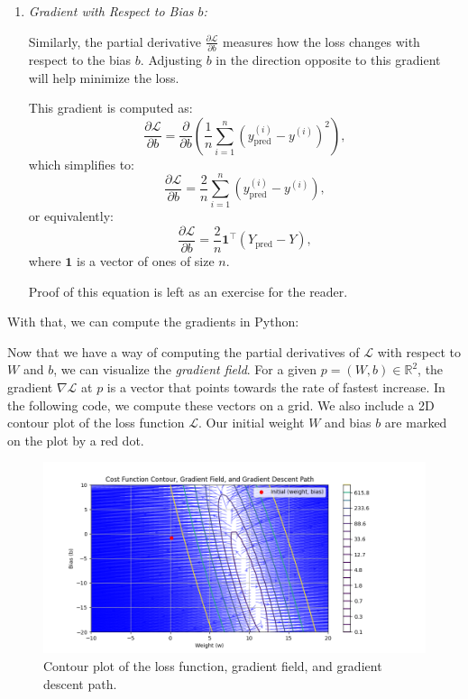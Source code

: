 \begin{enumerate}
    \item \textit{Gradient with Respect to Bias \( b \):}

    Similarly, the partial derivative \( \frac{\partial \mathcal{L}}{\partial b} \) measures how the loss changes with respect to the bias \( b \). Adjusting \( b \) in the direction opposite to this gradient will help minimize the loss.

    This gradient is computed as:
    \[
        \frac{\partial \mathcal{L}}{\partial b} = \frac{\partial}{\partial b} \left( \frac{1}{n} \sum_{i=1}^n (y_\text{pred}^{(i)} - y^{(i)})^2 \right),
    \]
    which simplifies to:
    \begin{equation}
    \label{eq:gradient-b}
    \frac{\partial \mathcal{L}}{\partial b} = \frac{2}{n} \sum_{i=1}^n (y_\text{pred}^{(i)} - y^{(i)}),
    \end{equation}
    or equivalently:
    \begin{equation}
    \label{eq:gradient-b-matrix}
    \frac{\partial \mathcal{L}}{\partial b} = \frac{2}{n} \mathbf{1}^\top \left( Y_{\text{pred}} - Y \right),
    \end{equation}
    where \( \mathbf{1} \) is a vector of ones of size \( n \).

    Proof of this equation is left as an exercise for the reader.
\end{enumerate}


With that, we can compute the gradients in Python:



Now that we have a way of computing the partial derivatives of $\mathcal{L}$ with respect to $W$ and $b$, we can visualize the \textit{gradient field}. For a given $p=(W, b) \in \mathbb{R}^2$, the gradient $\nabla \mathcal{L}$ at $p$ is a vector that points towards the rate of fastest increase. In the following code, we compute these vectors on a grid. We also include a 2D contour plot of the loss function $\mathcal{L}$. Our initial weight $W$ and bias $b$ are marked on the plot by a red dot.



\begin{figure}
    \centering
    \includegraphics[width=330pt]{Regression/code/gradient-field-1.png}
    \caption{Contour plot of the loss function, gradient field, and gradient descent path.}
    \label{fig:linear3}
\end{figure}
    
